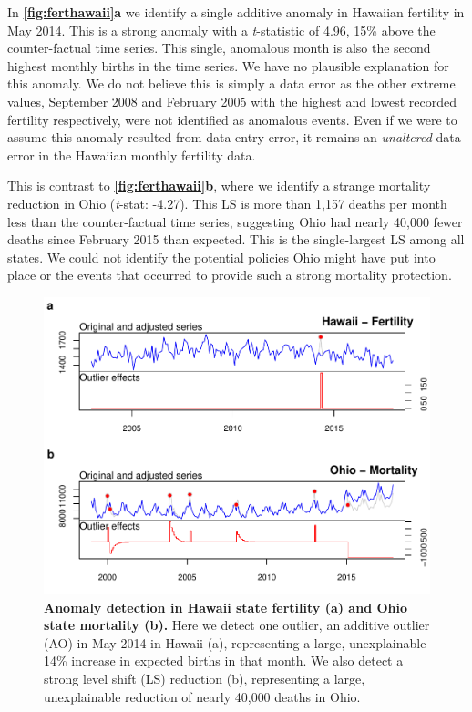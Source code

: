 \documentclass[12pt]{article}
\begin{document}
In \textbf{\autoref{fig:ferthawaii}a} we identify a single additive
anomaly in Hawaiian fertility in May 2014. This is a strong anomaly with
a \emph{t}-statistic of 4.96, 15\% above the counter-factual time
series. This single, anomalous month is also the second highest monthly
births in the time series. We have no plausible explanation for this
anomaly. We do not believe this is simply a data error as the other
extreme values, September 2008 and February 2005 with the highest and
lowest recorded fertility respectively, were not identified as anomalous
events. Even if we were to assume this anomaly resulted from data entry
error, it remains an \emph{unaltered} data error in the Hawaiian monthly
fertility data.

This is contrast to \textbf{\autoref{fig:ferthawaii}b}, where we
identify a strange mortality reduction in Ohio (\emph{t}-stat: -4.27).
This LS is more than 1,157 deaths per month less than the
counter-factual time series, suggesting Ohio had nearly 40,000 fewer
deaths since February 2015 than expected. This is the single-largest LS
among all states. We could not identify the potential policies Ohio
might have put into place or the events that occurred to provide such a
strong mortality protection.

\begin{figure}
\centering
\includegraphics{MainDocument_files/figure-latex/TrueAnomalies-1.pdf}
\caption{\textbf{Anomaly detection in Hawaii state fertility (a) and Ohio state mortality (b).}
Here we detect one outlier, an additive outlier (AO) in May 2014 in
Hawaii (a), representing a large, unexplainable 14\% increase in
expected births in that month. We also detect a strong level shift (LS)
reduction (b), representing a large, unexplainable reduction of nearly
40,000 deaths in Ohio. \label{fig:ferthawaii}}
\end{figure}
\end{document}
